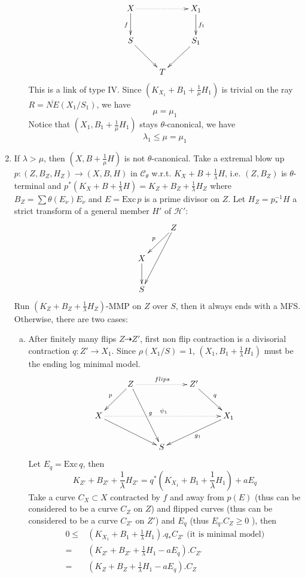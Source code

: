 \documentclass{article}
\begin{document}
\begin{enumerate}[step 1]
\begin{enumerate}[1)]
$$ \xymatrix{
X\ar[d]_f\ar@{.>}[rr]&&X_1\ar[d]^{f_1}\\
S\ar[dr]&&S_1\ar[dl]\\
&T &}$$
This is a link of type IV. Since $ (K_{X_1}+B_1+\frac{1}{\mu}H_1) $ is trivial on the ray $ R=\overline{NE}(X_1/S_1) $, we  have 
$$ \mu=\mu_1 $$
Notice that $ (X_1,B_1+\frac{1}{\mu}H_1) $ stays $ \theta $-canonical, we have
$$ \lambda_1\leqslant \mu=\mu_1 $$
\end{enumerate}
\item If $ \lambda>\mu $, then $ (X,B+\frac{1}{\mu}H) $ is not $ \theta $-canonical. Take a extremal blow up $ p:(Z,B_Z,H_Z)\to (X,B,H) $ in $ \mathcal{C}_\theta $ w.r.t. $ K_X+B+\frac{1}{\lambda}H $, i.e. $ (Z,B_Z) $ is $ \theta $-terminal and $ p^*(K_X+B+\frac{1}{\lambda}H)=K_Z+B_Z+\frac{1}{\lambda}H_Z $ where $ B_Z=\sum\theta(E_\nu)E_\nu $ and $ E=\mathrm{Exc}\,p $ is a prime divisor on $ Z $.  Let $ H_Z=p^{-1}_*H $ a strict transform of a general member $ H' $ of $ \mathcal{H}' $: 
$$ \xymatrix{
&Z\ar[ld]_p\ar[ldd]\\
X\ar[d]&\\
S} $$
Run $ (K_Z+B_Z+\frac{1}{\lambda}H_Z) $-MMP on $ Z $ over $ S $, then it always ends with a MFS. Otherwise, there are two cases:
\begin{enumerate}[a)]
\item After finitely many flips $ Z\dashrightarrow Z' $, first non flip contraction is a divisorial contraction $ q:Z'\to X_1 $. Since $ \rho(X_1/S)=1 $, $ (X_1,B_1+\frac{1}{\lambda}H_1) $ must be the ending log minimal model.
$$ \xymatrix{
&Z\ar[ld]_p\ar[rdd]^{g}\ar@{.>}[rr]^{flips}&&Z'\ar[dr]^{q}&\\
X\ar[drr]\ar@{.>}[rrrr]^{\psi_1}&&&&X_1\ar[dll]^{g_1}\\
&&S&&} $$
Let $ E_q=\mathrm{Exc}\,q $, then 
$$ K_{Z'}+B_{Z'}+\frac{1}{\lambda}H_{Z'}=q^*(K_{X_1}+B_1+\frac{1}{\lambda}H_1)+aE_q $$
Take a curve $ C_X\subset X $ contracted by $ f $ and away from $ p(E) $ (thus can be considered to be a curve $ C_Z $ on $ Z $) and flipped curves (thus can be considered to be a curve $ C_{Z'} $ on $ Z' $) and $ E_q $ (thus $ E_q.C_Z\geqslant 0 $ ), then
\begin{equation*}
\begin{aligned}
0\leqslant& (K_{X_1}+B_1+\frac{1}{\lambda}H_1).q_*C_{Z'} \text{ (it is minimal model)}\\
=&(K_{Z'}+B_{Z'}+\frac{1}{\lambda}H_1-aE_q).C_{Z'}\\
=&(K_{Z}+B_{Z}+\frac{1}{\lambda}H_1-aE_q).C_{Z}\\

\end{aligned}
\end{equation*}
\end{enumerate}
\end{enumerate}
\end{document}
